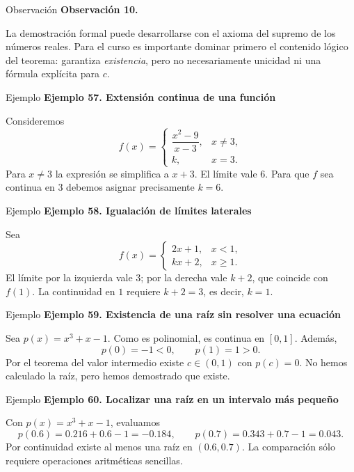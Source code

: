 \documentclass[12pt,aspectratio=169]{beamer}
\begin{document}
\begin{frame}[t,allowframebreaks]{Observación}
{\color{azul}\bfseries Observación 10.}\par\medskip

La demostración formal puede desarrollarse con el axioma del supremo de los números reales. Para el curso es importante dominar primero el contenido lógico del teorema: garantiza \emph{existencia}, pero no necesariamente unicidad ni una fórmula explícita para $c$.
\end{frame}


\begin{frame}[t,allowframebreaks]{Ejemplo}
{\color{azul}\bfseries Ejemplo 57. Extensión continua de una función}\par\medskip

Consideremos
\[
f(x)=\begin{cases}
\dfrac{x^2-9}{x-3},&x\ne3,\\
k,&x=3.
\end{cases}
\]
Para $x\ne3$ la expresión se simplifica a $x+3$. El límite vale $6$. Para que $f$ sea continua en $3$ debemos asignar precisamente $\boxed{k=6}$.
\end{frame}


\begin{frame}[t,allowframebreaks]{Ejemplo}
{\color{azul}\bfseries Ejemplo 58. Igualación de límites laterales}\par\medskip

Sea
\[
f(x)=\begin{cases}
2x+1,&x<1,\\kx+2,&x\ge1.
\end{cases}
\]
El límite por la izquierda vale $3$; por la derecha vale $k+2$, que coincide con $f(1)$. La continuidad en $1$ requiere $k+2=3$, es decir, $\boxed{k=1}$.
\end{frame}


\begin{frame}[t,allowframebreaks]{Ejemplo}
{\color{azul}\bfseries Ejemplo 59. Existencia de una raíz sin resolver una ecuación}\par\medskip

Sea $p(x)=x^3+x-1$. Como es polinomial, es continua en $[0,1]$. Además,
\[
 p(0)=-1<0,\qquad p(1)=1>0.
\]
Por el teorema del valor intermedio existe $c\in(0,1)$ con $p(c)=0$. No hemos calculado la raíz, pero hemos demostrado que existe.
\end{frame}


\begin{frame}[t,allowframebreaks]{Ejemplo}
{\color{azul}\bfseries Ejemplo 60. Localizar una raíz en un intervalo más pequeño}\par\medskip

Con $p(x)=x^3+x-1$, evaluamos
\[
 p(0.6)=0.216+0.6-1=-0.184,\qquad
 p(0.7)=0.343+0.7-1=0.043.
\]
Por continuidad existe al menos una raíz en $(0.6,0.7)$. La comparación sólo requiere operaciones aritméticas sencillas.
\end{frame}
\end{document}
